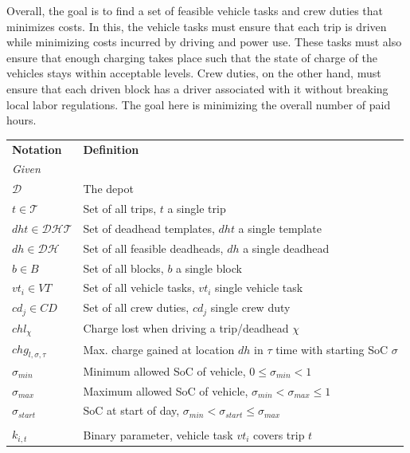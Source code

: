 \documentclass[]{article}
\begin{document}
Overall, the goal is to find a set of feasible vehicle tasks and crew duties that minimizes costs. In this, the vehicle tasks must ensure that each trip is driven while minimizing costs incurred by driving and power use. These tasks must also ensure that enough charging takes place such that the state of charge of the vehicles stays within acceptable levels. Crew duties, on the other hand, must ensure that each driven block has a driver associated with it without breaking local labor regulations. The goal here is minimizing the overall number of paid hours.

\begin{table}[h]
  \centering
  \begin{tabular}{ll}
    \toprule
    \multicolumn{1}{l}{\textbf{Notation}} & \multicolumn{1}{l}{\textbf{Definition}}               \\
    \cmidrule(lr){1-1}\cmidrule(lr){2-2}
    \multicolumn{2}{l}{\textit{Given}} \\
    $\mathcal{D}$ & The depot \\ 
    $t \in \mathcal{T}$ & Set of all trips, $t$ a single trip \\
    $dht \in \mathcal{DHT}$ & Set of deadhead templates, $dht$ a single template \\ 
    $dh \in \mathcal{DH}$ & Set of all feasible deadheads, $dh$ a single deadhead \\ 
    $b \in B$ & Set of all blocks, $b$ a single block \\
    $vt_i \in VT$ & Set of all vehicle tasks, $vt_i$ single vehicle task \\
    $cd_j \in CD$ & Set of all crew duties, $cd_j$ single crew duty \\
    $chl_\chi$ & Charge lost when driving a trip/deadhead $\chi$ \\
    $chg_{l,\sigma,\tau}$ & Max. charge gained at location $dh$ in $\tau$ time with starting SoC $\sigma$ \\
    $\sigma_{min}$ & Minimum allowed SoC of vehicle, $0 \leq \sigma_{min} < 1$\\
    $\sigma_{max}$ & Maximum allowed SoC of vehicle, $\sigma_{min} < \sigma_{max} \leq 1$ \\ 
    $\sigma_{start}$ & SoC at start of day, $\sigma_{min} < \sigma_{start} \leq \sigma_{max}$  \\
    \addlinespace[0.6em]
    \multicolumn{2}{l}{\textit{Parameters}} \\
    $k_{i,t}$ & Binary parameter, vehicle task $vt_i$ covers trip $t$ \\ 

\end{tabular}
\end{table}
\end{document}
